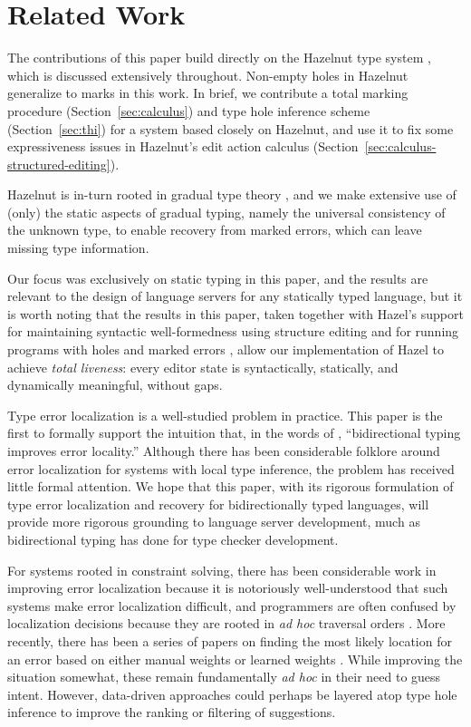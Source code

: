 \section{Related Work}
\label{sec:related}

The contributions of this paper build directly on the Hazelnut type system \cite{HazelnutPOPL}, which is discussed extensively throughout. Non-empty holes in Hazelnut generalize to marks in this work. In brief, we contribute a total marking procedure (Section~\ref{sec:calculus}) and type hole inference scheme (Section~\ref{sec:thi}) for a system based closely on Hazelnut, and use it to fix some expressiveness issues in Hazelnut's edit action calculus (Section~\ref{sec:calculus-structured-editing}). 

Hazelnut is in-turn rooted in gradual type theory \cite{Siek06a, siek2015refined}, and we make extensive use of (only) the static aspects of gradual typing, namely the universal consistency of the unknown type, to enable recovery from marked errors, which can leave missing type information.

Our focus was exclusively on static typing in this paper, and the results are relevant to the design of language servers for any statically typed language, but it is worth noting that the results in this paper, taken together with Hazel's support for maintaining syntactic well-formedness using structure editing \cite{DBLP:conf/vl/Moon023,moon2022tylr} and for running programs with holes and marked errors \cite{HazelLive}, allow our implementation of Hazel to achieve \emph{total liveness}: every editor state is syntactically, statically, and dynamically meaningful, without gaps.

Type error localization is a well-studied problem in practice. This paper is the first to formally support the intuition that, in the words of \citet{BidirTyping}, ``bidirectional typing improves error locality.'' Although there has been considerable folklore around error localization 
for systems with local type inference, the problem has received little formal attention. We hope that this paper, with its rigorous formulation
of type error localization and recovery for bidirectionally typed languages, will provide more rigorous grounding to language server development,
much as bidirectional typing has done for type checker development.

For systems rooted in constraint solving, there has been considerable work in improving error localization because it is notoriously well-understood that such systems make error localization difficult, and programmers are often confused by localization decisions \cite{DBLP:conf/popl/Wand86} because they are rooted in \emph{ad hoc} traversal orders \cite{mcadam1998unification,DBLP:journals/toplas/LeeY98}. More recently, there has been a series of papers on finding the most likely location for an error based on either manual weights \cite{DBLP:conf/popl/ZhangM14,DBLP:conf/oopsla/PavlinovicKW14} or learned weights \cite{SeidelBlame}.
While improving the situation somewhat, these remain fundamentally \emph{ad hoc} in their need to guess intent. However, data-driven approaches could perhaps be layered atop type hole inference to improve the ranking or filtering of suggestions.

